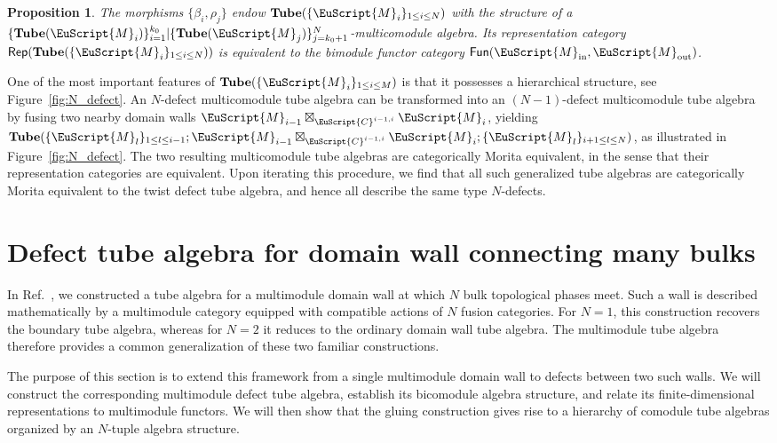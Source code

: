 \documentclass[a4paper,11pt]{article}
\newtheorem{proposition}[theorem]{Proposition}
\theoremstyle{definition}
\theoremstyle{remark}
\newcommand\eC           {\EuScript{C}}
\newcommand\eM          {\EuScript{M}}
\newcommand{\Rep}{\mathsf{Rep}}
\newcommand{\Fun}{\mathsf{Fun}}
\begin{document}
\begin{proposition}
    The morphisms $\{\beta_i,\rho_j\}$ endow $\mathbf{Tube}(\{\eM_i\}_{1\leq i\leq N})$ with the structure of a $\{\mathbf{Tube}(\eM_i)\}_{i=1}^{k_0}|\{\mathbf{Tube}(\eM_j)\}_{j=k_0+1}^N$-multicomodule algebra. Its representation category $\Rep(\mathbf{Tube}(\{\eM_i\}_{1\leq i\leq N}))$ is equivalent to the bimodule functor category $\Fun(\eM_{\rm in}, \eM_{\rm out})$.
\end{proposition}

One of the most important features of $\mathbf{Tube}(\{\eM_i\}_{1\leq i \leq M})$ is that it possesses a hierarchical structure, see Figure~\ref{fig:N_defect}. An $N$-defect multicomodule tube algebra can be transformed into an $(N-1)$-defect multicomodule tube algebra by fusing two nearby domain walls $\eM_{i-1}\boxtimes_{\eC^{i-1,i}}\eM_{i}$, yielding $\mathbf{Tube}(\{\eM_l\}_{1\leq l \leq i-1}; \eM_{i-1}\boxtimes_{\eC^{i-1,i}}\eM_{i};\{\eM_l\}_{i+1\leq l \leq N} )$, as illustrated in Figure~\ref{fig:N_defect}. The two resulting multicomodule tube algebras are categorically Morita equivalent, in the sense that their representation categories are equivalent. Upon iterating this procedure, we find that all such generalized tube algebras are categorically Morita equivalent to the twist defect tube algebra, and hence all describe the same type $N$-defects.















\section{Defect tube algebra for domain wall connecting many bulks}
\label{sec:multi-moduletube}


In Ref.~\cite{jia2025tube}, we constructed a tube algebra for a multimodule domain wall at which $N$ bulk topological phases meet. Such a wall is described mathematically by a multimodule category equipped with compatible actions of $N$ fusion categories. For $N=1$, this construction recovers the boundary tube algebra, whereas for $N=2$ it reduces to the ordinary domain wall tube algebra. The multimodule tube algebra therefore provides a common generalization of these two familiar constructions.

The purpose of this section is to extend this framework from a single multimodule domain wall to defects between two such walls. We will
construct the corresponding multimodule defect tube algebra, establish its bicomodule algebra structure, and relate its finite-dimensional
representations to multimodule functors. We will then show that the gluing construction gives rise to a hierarchy of comodule tube algebras organized by an $N$-tuple algebra structure. 
\end{document}
